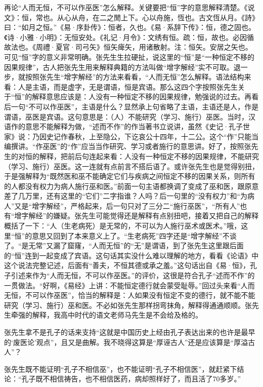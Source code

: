 再论“人而无恒，不可以作巫医”怎么解释。关键要把“恒”字的意思解释清楚。《说文》：恒，常也。从心从舟，在二之閒上下。心以舟施，恆也。古文恆从月。《詩》曰：“如月之恒。”《易·序卦传》：恒者，久也。《易·系辞下传》：恒，德之固也。《诗·小雅·小明》：无恒安处。《礼记·月令》：文绣有恒。疏：恒，故也。必因循故法也。《周禮·夏官·司弓矢》恒矢痺矢，用诸散射。注：恒矢。安居之矢也。可见“恒”字的意义非常明确。张先生生拉硬扯，说这里的“恒”是“一种恒定不移的因果规律”，古人把张先生用来解释典籍的方法叫做“增字解经”实不可取。退一步，就按照张先生“增字解经”的方法来看看，“人而无恒”怎么解释。语法结构来看：人是主语，而是虚字，无是谓语，恒是宾语。那么这四个字按照张先生关于“恒”的解释意思应该是：人没有一种恒定不移的因果规律，勉强说的过去。再看后一句“不可以作巫医”，主语是什么？显然承上句省略了主语，主语还是人，作是谓语，巫医是宾语。这句意思是：（人）不能研究（学习、施行）巫医。当时，汉语作的意思不能解释为做，“述而不作”的作当著书立说讲，虽然《史记·孔子世家》说：乃因史记作春秋，上至隐公，下讫哀公十四年，十二公。这个“作”只能当编撰讲。“作巫医”的“作”应当当作研究、学习或者施行的意思讲。好了，按照张先生的对恒的解释，把前后句连起来看：人没有一种恒定不移的因果规律，不能研究（学习、施行）巫医。这一连就有点前言不搭后语了。或许张先生也是觉得别扭，于是强解释为“既然医和巫不能确定它们与疾病之间恒定不移的因果关系，则所有的人都没有权力为病人施行巫和医。”前面一句主语都换调了变成了巫和医，跟原意差了几万里，还有这里的“它们”二字指谁？人吗？后一句里的“没有权力”和“为病人”又是“增字解经”，严格起来，后一句只对了三分二“施行巫医”，“所有人”也有“增字解经”的嫌疑。张先生可能觉得还是解释有点别扭吧，接着又把自己的解释概括了一下：“人（生老病死）是无常的，不可以为人施行巫术或医术。”哦，这里“恒”的意思又回到了本来意义上了。“生老病死”四字还是“增字解经”不谈了。“是无常”又漏了窟窿，“人而无恒”的“无”是谓语，到了张先生这里跟后面的“恒”连到一起变成了宾语。这句话其实没什么难以理解的地方，看看《论语》中这个说法完整记述，后面有“善夫，不恒其德或承之羞。”这句话出自《易·恒》，孔子引述来作为“人而无恒，不可以作巫医。”的评价，这很是符合孔子“述而不作”的一贯做法。“好啊，《易经》上讲：不能恒定德行就会蒙受耻辱。”回过头来看“人而无恒，不可以作巫医”，恰当的解释是：人如果没有恒定不变的德行，就不能不能研究（学习、施行）巫和医。不必如张先生那样拐弯抹角，解释得通通顺顺。张先生牵强的解释，我高中时代的语文老师马先生是不会给及格的。

张先生拿不是孔子的话来支持“这就是中国历史上经由孔子表达出来的也许是最早的‘废医论’观点”，且又是曲解。我不晓得这算是“厚诬古人”还是应该算是“厚溢古人”？

张先生既不能证明“孔子不相信巫”，也不能证明“孔子不相信医”，就赶紧下结论：“孔子既不相信祷告，也不相信医药，病却照样好了，而且活了70多岁。”

